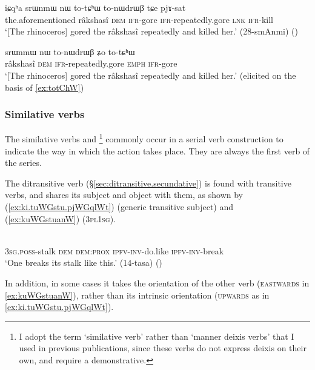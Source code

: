 \begin{exe}
\ex \label{ex:totChW}
\gll iɕqʰa srɯnmɯ nɯ to-tɕʰɯ to-nɯdrɯβ tɕe pjɤ-sat \\
the.aforementioned râkshasî \textsc{dem} \textsc{ifr}-gore \textsc{ifr}-repeatedly.gore  \textsc{lnk} \textsc{ifr}-kill \\
\glt `[The rhinoceros] gored the râkshasî repeatedly and killed her.' (28-smAnmi)
()
\end{exe}

\begin{exe}
\ex \label{ex:totChW2}
\gll srɯnmɯ nɯ to-nɯdrɯβ ʑo to-tɕʰɯ \\
 râkshasî \textsc{dem}  \textsc{ifr}-repeatedly.gore  \textsc{emph}  \textsc{ifr}-gore \\
 \glt `[The rhinoceros] gored the râkshasî repeatedly and killed her.' (elicited on the basis of \ref{ex:totChW})
\end{exe}	

\subsubsection{Similative verbs} \label{sec:svc.similative.verb}
The similative verbs  and \footnote{I adopt the term `similative verb' \citep{creissels17similative} rather than `manner deixis verbs' that I used in previous publications, since these verbs do not express deixis on their own, and require a demonstrative. } commonly occur in a serial verb construction to indicate the way in which the action takes place. They are always the first verb of the series. 

The ditransitive verb  (§\ref{sec:ditransitive.secundative}) is found with transitive verbs, and shares its subject and object with them, as shown by (\ref{ex:ki.tuWGstu.pjWGqlWt}) (generic transitive subject) and (\ref{ex:kuWGstuanW}) (\textsc{3pl}\fl{}\textsc{1sg}).

\begin{exe}
\ex \label{ex:ki.tuWGstu.pjWGqlWt}
 \\
\textsc{3sg}.\textsc{poss}-stalk \textsc{dem} \textsc{dem}:\textsc{prox} \textsc{ipfv}-\textsc{inv}-do.like \textsc{ipfv}-\textsc{inv}-break \\
\glt `One breaks its stalk like this.' (14-tasa)
()
\end{exe}	

In addition, in some cases it takes the orientation of the other verb (\textsc{eastwards} in \ref{ex:kuWGstuanW}), rather than its intrinsic orientation (\textsc{upwards} as in \ref{ex:ki.tuWGstu.pjWGqlWt}).

